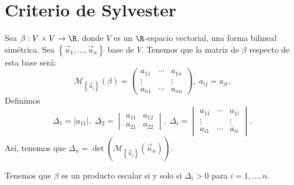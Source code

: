 \section*{Criterio de Sylvester}
Sea $\displaystyle \beta : V \times V \to \R $, donde $\displaystyle V $ es un $\displaystyle \R $-espacio vectorial, una forma bilineal simétrica. Sea $\displaystyle \left\{ \vec{u}_{1}, \ldots, \vec{u}_{n}\right\}  $ base de $\displaystyle V $. Tenemos que la matriz de $\displaystyle \beta  $ respecto de esta base será:
\[\mathcal{M}_{ \left\{ \vec{u}_{i}\right\} }\left(\beta \right)= \begin{pmatrix} a_{11} & \cdots & a_{1n} \\
\vdots & & \vdots \\
a_{n1} & \cdots & a_{nn}\end{pmatrix}, \; a_{ij} = a_{ji} .\]
Definimos 
	\[ \Delta_{1} = \left|a_{11}\right|, \; \Delta_{2} = \begin{vmatrix} a_{11} & a_{12} \\ a_{21} & a_{22} \end{vmatrix} , \; \Delta_{i} = \begin{vmatrix} a_{11} & \cdots & a_{1i}\\
\vdots & & \vdots \\
 a_{i1} & \cdots & a_{ii}\end{vmatrix}  .\]
Así, tenemos que $\displaystyle \Delta_{n} = \det\left(\mathcal{M}_{ \left\{ \vec{u}_{i}\right\} }\left(\vec{u}_{n}\right)\right) $. 
\begin{ftheorem}
\normalfont Tenemos que $\displaystyle \beta  $ es un producto escalar si y solo si $\displaystyle \Delta_{i} > 0 $ para $\displaystyle i = 1, \ldots, n $. 
\end{ftheorem}
